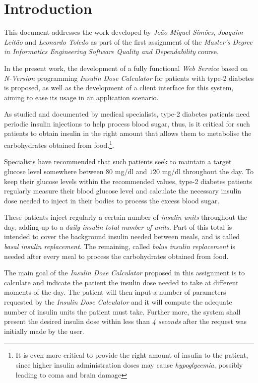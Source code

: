 \chapter{Introduction}

This document addresses the work developed by \emph{João Miguel Simões}, \emph{Joaquim Leitão} and \emph{Leonardo Toledo} as part of the first assignment of the \emph{Master's Degree in Informatics Engineering} \emph{Software Quality and Dependability} course.

In the present work, the development of a fully functional \emph{Web Service} based on \emph{N-Version} programming \emph{Insulin Dose Calculator} for patients with type-2 diabetes is proposed, as well as the development of a client interface for this system, aiming to ease its usage in an application scenario.

As studied and documented by medical specialists, type-2 diabetes patients need periodic insulin injections to help process blood sugar, thus, is it critical for such patients to obtain insulin in the right amount that allows them to metabolise the carbohydrates obtained from food.\footnote{It is even more critical to provide the right amount of insulin to the patient, since higher insulin administration doses may cause \emph{hypoglycemia}, possibly leading to coma and brain damage}.

Specialists have recommended that such patients seek to maintain a target glucose level somewhere between $80$ mg/dl and $120$ mg/dl throughout the day. To keep their glucose levels within the recommended values, type-2 diabetes patients regularly measure their blood glucose level and calculate the necessary insulin dose needed to inject in their bodies to process the excess blood sugar.

These patients inject regularly a certain number of \emph{insulin units} throughout the day, adding up to a \emph{daily insulin total number of units}. Part of this total is intended to cover the background insulin needed between meals, and is called \emph{basal insulin replacement}. The remaining, called \emph{bolus insulin replacement} is needed after every meal to process the carbohydrates obtained from food.

The main goal of the \emph{Insulin Dose Calculator} proposed in this assignment is to calculate and indicate the patient the insulin dose needed to take at different moments of the day. The patient will then input a number of parameters requested by the \emph{Insulin Dose Calculator} and it will compute the adequate number of insulin units the patient must take. Further more, the	system shall present the desired insulin dose within less than \emph{4 seconds} after the request was initially made by the user.

